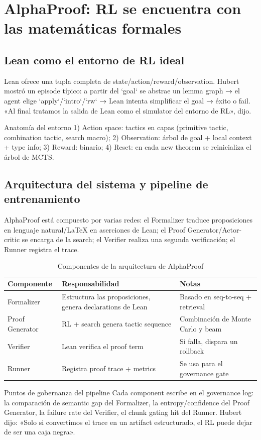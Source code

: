 \section{AlphaProof: RL se encuentra con las matemáticas formales}

\subsection{Lean como el entorno de RL ideal}
Lean ofrece una tupla completa de state/action/reward/observation. Hubert mostró un episode típico: a partir del `goal` se abstrae un lemma graph → el agent elige `apply`/`intro`/`rw` → Lean intenta simplificar el goal → éxito o fail. «Al final tratamos la salida de Lean como el simulator del entorno de RL», dijo.
\begin{importantbox}{Anatomía del entorno}
1) Action space: tactics en capas (primitive tactic, combination tactic, search macro); 2) Observation: árbol de goal + local context + type info; 3) Reward: binario; 4) Reset: en cada new theorem se reinicializa el árbol de MCTS.
\end{importantbox}

\subsection{Arquitectura del sistema y pipeline de entrenamiento}
AlphaProof está compuesto por varias redes: el Formalizer traduce proposiciones en lenguaje natural/LaTeX en aserciones de Lean; el Proof Generator/Actor-critic se encarga de la search; el Verifier realiza una segunda verificación; el Runner registra el trace.
\begin{table}[H]
\centering
\begin{tabular}{p{4.5cm}p{4.5cm}p{4cm}}
\toprule
Componente & Responsabilidad & Notas \\
\midrule
Formalizer & Estructura las proposiciones, genera declarations de Lean & Basado en seq-to-seq + retrieval \\
Proof Generator & RL + search genera tactic sequence & Combinación de Monte Carlo y beam \\
Verifier & Lean verifica el proof term & Si falla, dispara un rollback \\
Runner & Registra proof trace + metrics & Se usa para el governance gate \\
\bottomrule
\end{tabular}
\caption{Componentes de la arquitectura de AlphaProof}
\end{table}
\begin{knowledgebox}{Puntos de gobernanza del pipeline}
Cada component escribe en el governance log: la comparación de semantic gap del Formalizer, la entropy/confidence del Proof Generator, la failure rate del Verifier, el chunk gating hit del Runner. Hubert dijo: «Solo si convertimos el trace en un artifact estructurado, el RL puede dejar de ser una caja negra».
\end{knowledgebox}

